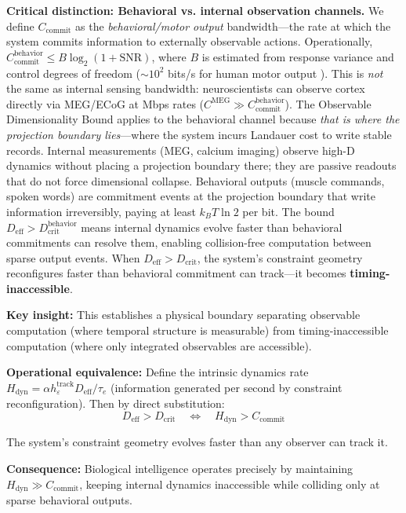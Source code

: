 \documentclass[12pt]{article}
\begin{document}
\textbf{Critical distinction: Behavioral vs. internal observation channels.} We define $C_{\text{commit}}$ as the \emph{behavioral/motor output} bandwidth---the rate at which the system commits information to externally observable actions. Operationally, $C_{\text{commit}}^{\text{behavior}} \le B \log_2(1+\text{SNR})$, where $B$ is estimated from response variance and control degrees of freedom ($\sim 10^2$ bits/s for human motor output \cite{fitts1954}). This is \textit{not} the same as internal sensing bandwidth: neuroscientists can observe cortex directly via MEG/ECoG at Mbps rates ($C^{\text{MEG}} \gg C_{\text{commit}}^{\text{behavior}}$). The Observable Dimensionality Bound applies to the behavioral channel because \textit{that is where the projection boundary lies}---where the system incurs Landauer cost to write stable records. Internal measurements (MEG, calcium imaging) observe high-D dynamics without placing a projection boundary there; they are passive readouts that do not force dimensional collapse. Behavioral outputs (muscle commands, spoken words) are commitment events at the projection boundary that write information irreversibly, paying at least $k_B T \ln 2$ per bit. The bound $D_{\text{eff}} > D_{\text{crit}}^{\text{behavior}}$ means internal dynamics evolve faster than behavioral commitments can resolve them, enabling collision-free computation between sparse output events. When $D_{\text{eff}} > D_{\text{crit}}$, the system's constraint geometry reconfigures faster than behavioral commitment can track---it becomes \textbf{timing-inaccessible}.

\textbf{Key insight:} This establishes a physical boundary separating observable computation (where temporal structure is measurable) from timing-inaccessible computation (where only integrated observables are accessible).

\textbf{Operational equivalence:} Define the intrinsic dynamics rate $H_{\text{dyn}} = \alpha h_\varepsilon^{\text{track}} D_{\text{eff}}/\tau_e$ (information generated per second by constraint reconfiguration). Then by direct substitution:
\begin{equation}
D_{\text{eff}} > D_{\text{crit}} \quad \Longleftrightarrow \quad H_{\text{dyn}} > C_{\text{commit}}
\end{equation}

The system's constraint geometry evolves faster than any observer can track it.

\textbf{Consequence:} Biological intelligence operates precisely by maintaining $H_{\text{dyn}} \gg C_{\text{commit}}$, keeping internal dynamics inaccessible while colliding only at sparse behavioral outputs.
\end{document}
